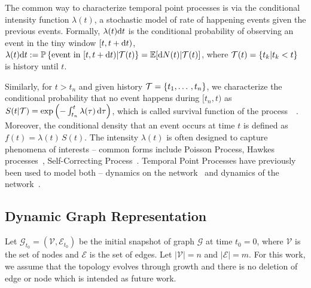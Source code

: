 \documentclass[11pt]{article}
\begin{document}
The common way to characterize temporal point processes is via the conditional intensity function $\lambda(t)$, a stochastic model of rate of happening events given the previous events. Formally, $\lambda(t){\mathrm d} t$ is the conditional probability of observing an event in the tiny window $[t, t+{\mathrm d} t)$,
$\lambda(t){\mathrm d} t := \mathbb{P}\left\{\text{event in }[t, t+{\mathrm d} t)|{\mathcal{T}}(t)\right\} = \mathbb{E}[{\mathrm d} N(t) | {\mathcal{T}}(t)]$, where 
${\mathcal{T}}(t)=\left\{t_k|t_k<t\right\}$ is history until $t$.

Similarly, for $t > t_n$ and given history ${\mathcal{T}}=\left\{t_1,\dotso, t_n\right\}$,  we characterize the conditional probability that no event happens during $[t_n, t)$ as $ S(t|{\mathcal{T}}) = \exp\left(-\int_{t_n}^{t} \lambda(\tau) \, {\mathrm d}\tau \right)$, which is called  survival function of the process~~\cite{AalBorGje08}.
Moreover, the conditional density that an event occurs at time $t$ is defined as $
f(t) = \lambda(t)\, S(t)
$.
%
The intensity $\lambda(t)$ is often designed to capture phenomena of interests -- common forms include 
Poisson Process, Hawkes processes~\cite{FarDuRodValZhaSon14,Hawkes71,WanXieDuSon16,TabValFarSonSchGom17}, Self-Correcting Process~\cite{IshWes79}. Temporal Point Processes have previously been used to model both -- dynamics on the network~\cite{FarYeHarSonZha16,ZarKhoFarRabZha17,FarYanYeXuTriKhaLiSonZha17} and dynamics of the network~\cite{TraFarSonZha15,FarWanGomLietal15}.

\vspace{-2mm}
\subsection{Dynamic Graph Representation}
\vspace{-2mm}
Let $\mathcal{G}_{t_0} = (\mathcal{V}, \mathcal{E}_{t_0})$ be the initial snapshot of graph $\mathcal{G}$ at time $t_0 = 0$, where $\mathcal{V}$ is the set of nodes and $\mathcal{E}$ is the set of edges. Let $|\mathcal{V}| = n$ and $|\mathcal{E}| = m$. For this work, we assume that the topology evolves through growth and there is no deletion of edge or node which is intended as future work.
\end{document}
